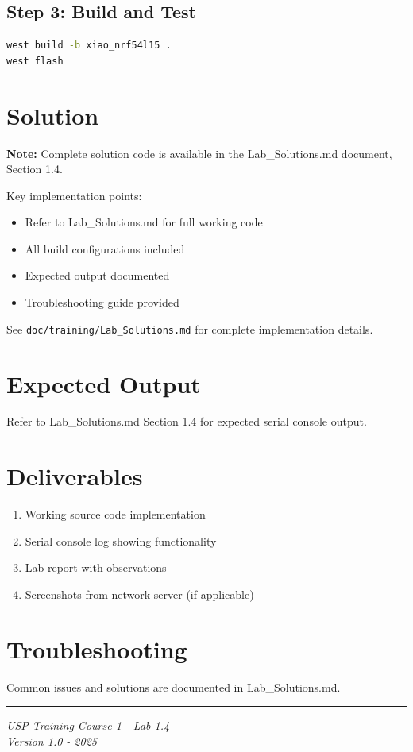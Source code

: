 \documentclass[11pt,a4paper]{article}
\begin{document}
\subsection{Step 3: Build and Test}
\begin{lstlisting}[language=bash]
west build -b xiao_nrf54l15 .
west flash
\end{lstlisting}

\section{Solution}

\begin{solutionbox}
\textbf{Note:} Complete solution code is available in the Lab\_Solutions.md document, Section 1.4.

Key implementation points:
\begin{itemize}
    \item Refer to Lab\_Solutions.md for full working code
    \item All build configurations included
    \item Expected output documented
    \item Troubleshooting guide provided
\end{itemize}

See \texttt{doc/training/Lab\_Solutions.md} for complete implementation details.
\end{solutionbox}

\section{Expected Output}

Refer to Lab\_Solutions.md Section 1.4 for expected serial console output.

\section{Deliverables}

\begin{enumerate}[itemsep=10pt]
    \item Working source code implementation
    \item Serial console log showing functionality
    \item Lab report with observations
    \item Screenshots from network server (if applicable)
\end{enumerate}

\section{Troubleshooting}

Common issues and solutions are documented in Lab\_Solutions.md.

\vfill
\noindent\rule{\textwidth}{0.4pt}
\begin{center}
\textit{USP Training Course 1 - Lab 1.4}\\
\textit{Version 1.0 - 2025}
\end{center}
\end{document}
